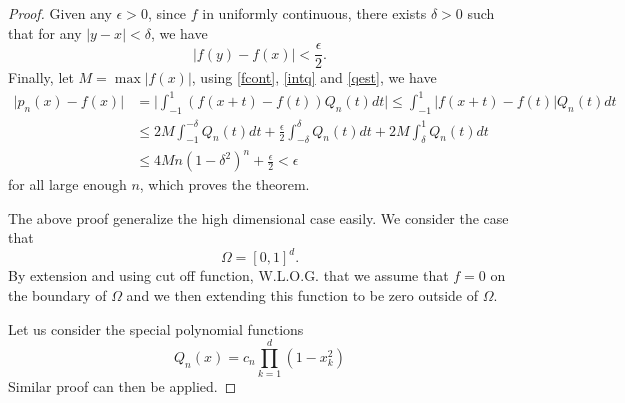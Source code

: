 \begin{proof}
Given any $\epsilon >0$, since $f$ in uniformly continuous, there exists $\delta>0$ such that for any $|y-x|<\delta$, we have 
\begin{equation}\label{fcont}
|f(y)-f(x)|< \frac{\epsilon}{2}.
\end{equation}
Finally, let $M=\max |f(x)|$, using \eqref{fcont}, \eqref{intq} and \eqref{qest}, we have 
\begin{align}
\big| p_n(x)-f(x)\big|&=\big|\int_{-1}^1(f(x+t)-f(t))Q_n(t)dt\big|\le \int_{-1}^1 \big| f(x+t)-f(t)\big| Q_n(t)dt\\
&\le 2M \int_{-1}^{-\delta} Q_n(t)dt+ \frac{\epsilon}{2}\int_{-\delta}^{\delta} Q_n(t)dt+ 2M\int_{\delta}^1 Q_n(t)dt\\
&\le 4M n(1-\delta^2)^n + \frac{\epsilon}{2}< \epsilon
\end{align}
for all large enough $n$, which proves the theorem. 

The above proof generalize the high dimensional case easily.   We
consider the case that
$$
\Omega=[0,1]^d.
$$
By extension and using cut off function,  W.L.O.G.  that we assume
that $f=0$ on the boundary of $\Omega$ and we then extending this
function to be zero outside of $\Omega$.  

Let us consider the special polynomial functions
\begin{equation}
  \label{Qn}
Q_n(x)=c_n\prod_{k=1}^d(1-x_k^2)  
\end{equation}
Similar proof can then be applied. 
\end{proof}






















